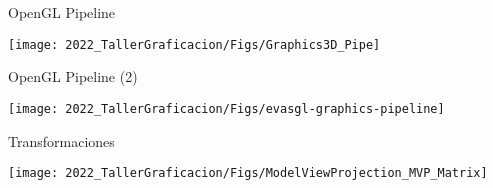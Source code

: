 
\begin{frame}{OpenGL Pipeline}
    \begin{center}
    \texttt{[image: 2022\_TallerGraficacion/Figs/Graphics3D\_Pipe]}
    \end{center}
\end{frame}


\begin{frame}{OpenGL Pipeline (2)}
    \begin{center}
    \texttt{[image: 2022\_TallerGraficacion/Figs/evasgl-graphics-pipeline]}
    \end{center}
\end{frame}

\begin{frame}{Transformaciones}
    \begin{center}
    \texttt{[image: 2022\_TallerGraficacion/Figs/ModelViewProjection\_MVP\_Matrix]}
    \end{center}
\end{frame}



